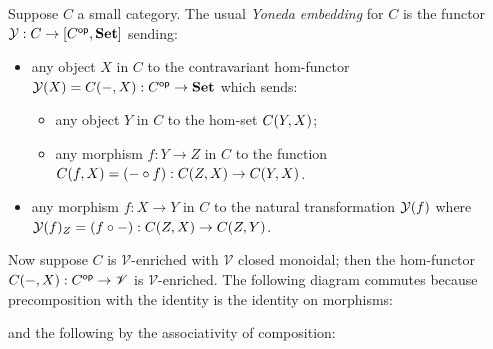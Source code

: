Suppose $C$ a small category. The usual \emph{Yoneda embedding} for $C$ is the functor $\mathcal{Y}: C \to
[C^{\mathsf{op}},\mathbf{Set}]$ sending:
\begin{itemize}
\item any object $X$ in $C$ to the contravariant hom-functor $\mathcal{Y}(X) = {C}(-,X): C^{\mathsf{op}} \to \mathbf{Set}$
which sends:
   \begin{itemize}
   \item any object $Y$ in $C$ to the hom-set ${C}(Y,X)$;
   \item any morphism $f: Y \to Z$ in $C$ to the function ${C}(f,X) = (- \circ f): {C}(Z,X) \to
   {C}(Y,X)$.
   \end{itemize}
\item any morphism $f: X \to Y$ in $C$ to the natural transformation $\mathcal{Y}(f)$ where $\mathcal{Y}(f)_Z = (f
\circ -): {C}(Z,X) \to {C}(Z,Y)$.
\end{itemize}

\noindent Now suppose $C$ is $\mathscr{V}$-enriched with $\mathscr{V}$ closed monoidal; then the hom-functor
${C}(-,X): C^{\mathsf{op}} \to \mathscr{V}$ is $\mathscr{V}$-enriched. The following diagram commutes because
precomposition with the identity is the identity on morphisms:

\begin{center}
\end{center}

\noindent and the following by the associativity of composition:

\begin{center}
\end{center}

\noindent {}

